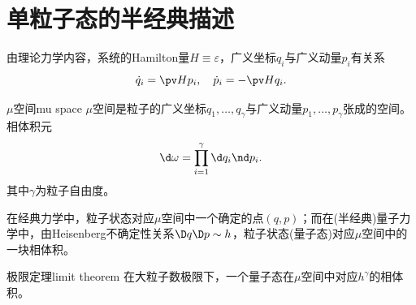 
\section{单粒子态的半经典描述}

由理论力学内容，系统的Hamilton量$H\equiv\varepsilon$，广义坐标$q_i$与广义动量$p_i$有关系
\[
	\dot q_i=\pv H{p_i},\quad\dot p_i=-\pv H{q_i}.
\]

\begin{definition}{$\mu$空间}{mu space}
	$\mu$空间是粒子的广义坐标$q_1,\ldots,q_\gamma$与广义动量$p_1,\ldots,p_\gamma$张成的空间。相体积元
	\begin{equation}
		\d\omega=\prod_{i=1}^\gamma\d q_i\nd p_i.
	\end{equation}
	其中$\gamma$为粒子自由度。
\end{definition}

\begin{remark}
	在经典力学中，粒子状态对应$\mu$空间中一个确定的点$(q,p)$；而在(半经典)量子力学中，由Heisenberg不确定性关系$\D q\D p\sim h$，粒子状态(量子态)对应$\mu$空间中的一块相体积。
\end{remark}

\begin{theorem}{极限定理}{limit theorem}
	在大粒子数极限下，一个量子态在$\mu$空间中对应$h^\gamma$的相体积。
\end{theorem}

